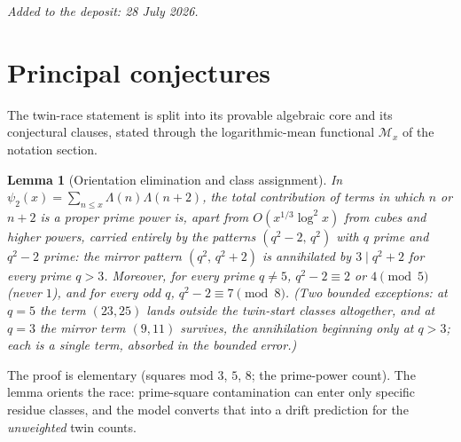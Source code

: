 \documentclass[11pt]{article}
\newtheorem{lemma}{Lemma}
\theoremstyle{definition}
\newcommand{\M}{\mathcal M}
\begin{document}
\medskip\noindent\emph{Added to the deposit: 28 July 2026.}\par\medskip

\section{Principal conjectures}

The twin-race statement is split into its provable algebraic core and
its conjectural clauses, stated through the logarithmic-mean
functional $\M_x$ of the notation section.

\begin{lemma}[Orientation elimination and class assignment]\label{l:c21}
In $\psi_2(x)=\sum_{n\le x}\Lambda(n)\Lambda(n+2)$, the total
contribution of terms in which $n$ or $n+2$ is a proper prime power
is, apart from $O(x^{1/3}\log^2 x)$ from cubes and higher powers,
carried entirely by the patterns $(q^2-2,\,q^2)$ with $q$ prime and
$q^2-2$ prime: the mirror pattern $(q^2,\,q^2+2)$ is annihilated by
$3\mid q^2+2$ for every prime $q>3$.  Moreover, for every prime
$q\neq5$, $q^2-2\equiv2$ or $4\pmod 5$ (never $1$), and for every odd
$q$, $q^2-2\equiv7\pmod8$.  (Two bounded exceptions: at $q=5$ the term $(23,25)$ lands outside the twin-start classes altogether, and at $q=3$ the mirror term $(9,11)$ survives, the annihilation beginning only at $q>3$; each is a single term, absorbed in the bounded error.)
\end{lemma}

The proof is elementary (squares mod $3$, $5$, $8$; the prime-power
count).  The lemma orients the race: prime-square contamination can
enter only specific residue classes, and the model converts that into
a drift prediction for the \emph{unweighted} twin counts.
\end{document}
